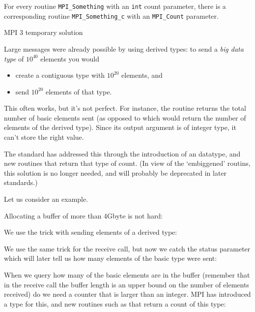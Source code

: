 \begin{mpifour}
  For every routine \lstinline{MPI_Something}
  with an \lstinline{int} count parameter,
  there is a corresponding routine \lstinline{MPI_Something_c}
  with an \lstinline{MPI_Count} parameter.


 {MPI 3 temporary solution}

Large messages were already possible by using 
derived types: to send
a \emph{big data type} of $10^{40}$ elements you would
\begin{itemize}
\item create a contiguous type with $10^{20}$ elements, and
\item send $10^{20}$ elements of that type.
\end{itemize}
This often works, but it's not perfect. For instance, the routine
 returns the total number of basic elements sent
(as opposed to  which would return the number
of elements of the derived type). Since its output argument is
of integer type, it can't store the right value.

The  standard has addressed this
through the introduction of an  datatype,
and new routines that return that type of count.
(In view of the `embiggened' routins, this solution
is no longer needed, and will probably be deprecated in later standards.)

Let us consider an example.

Allocating a buffer of more than 4Gbyte is not hard:

We use the trick with sending elements of a derived type:

We use the same trick for the receive call, but now we catch the status
parameter which will later tell us how many elements of the basic type
were sent:
%

When we query how many of the basic elements are in the buffer
(remember that in the receive call the buffer length is
an upper bound on the number of elements received)
do we
need a counter that is larger than an integer.  MPI has introduced a
type  for this, and new routines such as
 that return a
count of this type:


\end{mpifour}
